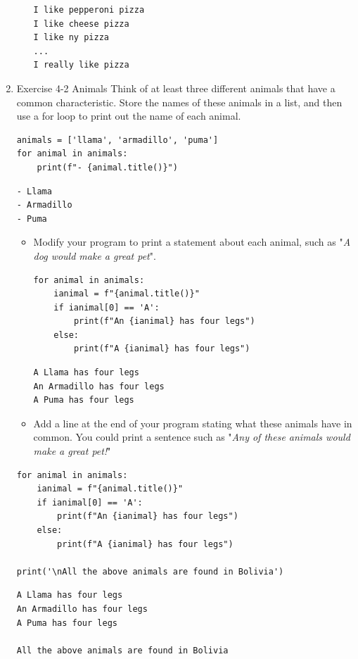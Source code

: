 \documentclass[10pt]{book}
\begin{document}
\begin{enumerate}
\begin{itemize}
\label{org059840a}
\begin{verbatim}
I like pepperoni pizza
I like cheese pizza
I like ny pizza
...
I really like pizza
\end{verbatim}
\end{itemize}
\item Exercise 4-2 Animals
\label{sec:orgb85ab34}
Think of at least three different animals that have a common characteristic. Store the names of these animals in a list, and then use a for loop to print out the name of each animal.
\begin{verbatim}
animals = ['llama', 'armadillo', 'puma']
for animal in animals:
    print(f"- {animal.title()}")
\end{verbatim}

\label{org86c8bf3}
\begin{verbatim}
- Llama
- Armadillo
- Puma
\end{verbatim}

\begin{itemize}
\item Modify your program to print a statement about each animal, such as "\emph{A dog would make a great pet}".
\begin{verbatim}
for animal in animals:
    ianimal = f"{animal.title()}"
    if ianimal[0] == 'A':
        print(f"An {ianimal} has four legs")
    else:
        print(f"A {ianimal} has four legs")
\end{verbatim}

\label{org18a716a}
\begin{verbatim}
A Llama has four legs
An Armadillo has four legs
A Puma has four legs
\end{verbatim}

\item Add a line at the end of your program stating what these animals have in common. You could print a sentence such as "\emph{Any of these animals would make a great pet!}"
\end{itemize}
\begin{verbatim}
for animal in animals:
    ianimal = f"{animal.title()}"
    if ianimal[0] == 'A':
        print(f"An {ianimal} has four legs")
    else:
        print(f"A {ianimal} has four legs")

print('\nAll the above animals are found in Bolivia')
\end{verbatim}

\label{org4ce6ad9}
\begin{verbatim}
A Llama has four legs
An Armadillo has four legs
A Puma has four legs

All the above animals are found in Bolivia
\end{verbatim}
\end{enumerate}
\end{document}
